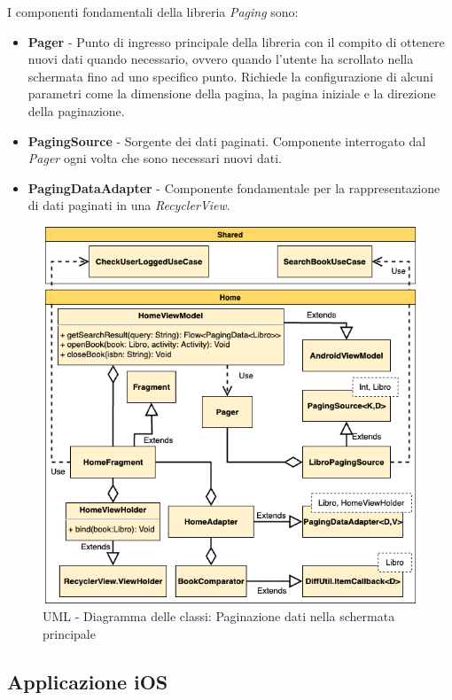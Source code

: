 I componenti fondamentali della libreria \textit{Paging} sono:
\begin{itemize}
    \item \textbf{Pager} - Punto di ingresso principale della libreria con il compito di ottenere nuovi dati quando necessario, ovvero quando l'utente ha scrollato nella schermata fino ad uno specifico punto. Richiede la configurazione di alcuni parametri come la dimensione della pagina, la pagina iniziale e la direzione della paginazione. 
    \item \textbf{PagingSource} - Sorgente dei dati paginati. Componente interrogato dal \textit{Pager} ogni volta che sono necessari nuovi dati.
    \item \textbf{PagingDataAdapter} - Componente fondamentale per la rappresentazione di dati paginati in una \textit{RecyclerView}.
\end{itemize}

\begin{figure}[H]
    \centering
    \includegraphics[width=1\textwidth]{img/android-viewmodel.png}
    \caption{UML - Diagramma delle classi: Paginazione dati nella schermata principale}
    \label{android-viewmodel-png}
\end{figure}

\subsection{Applicazione iOS}
